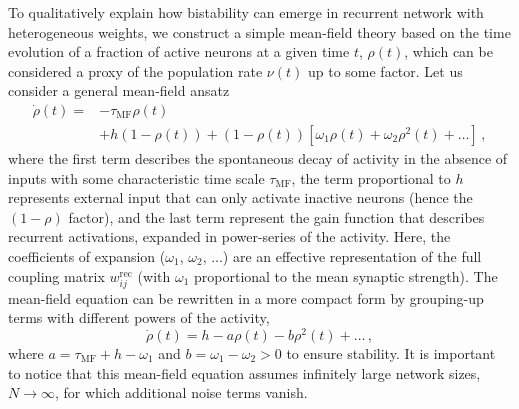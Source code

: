 To qualitatively explain how bistability can emerge in recurrent network with heterogeneous weights, we construct a simple mean-field theory based on the time evolution of a fraction of active neurons at a given time $t$, $\rho(t)$, which can be considered a proxy of the population rate $\nu(t)$ up to some factor.
Let us consider a general mean-field ansatz
\begin{align}
	\dot{\rho}(t) = &-\tau_\mathrm{MF}\rho(t) \nonumber \\
		&+h  (1-\rho(t)) + \left( 1-\rho(t) \right) \left[ \omega_1\rho(t) + \omega_2\rho^2(t)+\dots\right]\, ,
\end{align}
%
where the first term describes the spontaneous decay of activity in the absence of inputs with some characteristic time scale
$\tau_\mathrm{MF}$, the term proportional to $h$ represents external input that can only activate inactive neurons (hence the $(1-\rho)$ factor), and the last term represent the gain function that describes recurrent activations, expanded in power-series of the activity.
Here, the coefficients of expansion ($\omega_1$, $\omega_2$, ...) are an effective representation of the full coupling matrix $w^\mathrm{rec}_{ij}$ (with $\omega_1$ proportional to the mean synaptic strength).
The mean-field equation can be rewritten in a more compact form by grouping-up terms with different powers of the activity,
\begin{equation}\label{eq:MF_compact}
    \dot{\rho}(t) = h - a\rho(t) -b\rho^2(t) + \dots \, ,
\end{equation}
%
where $a=\tau_\mathrm{MF}+h-\omega_1$ and $b=\omega_1-\omega_2>0$ to ensure stability.
It is important to notice that this mean-field equation assumes infinitely large network sizes, $N\to\infty$, for which additional noise terms vanish.

